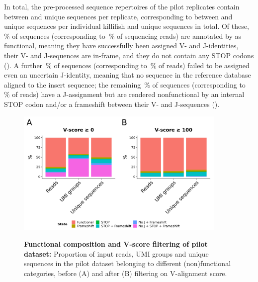 In total, the pre-processed sequence repertoires of the pilot replicates contain between  and  unique sequences per replicate, corresponding to between  and  unique sequences per individual killifish and  unique sequences in total. Of these, \,\% of sequences (corresponding to \,\% of sequencing reads) are annotated by  as functional, meaning they have successfully been assigned V- and J-identities, their V- and J-sequences are in-frame, and they do not contain any STOP codons (). A further \,\% of sequences (corresponding to \,\% of reads) failed to be assigned even an uncertain J-identity, meaning that no \jh sequence in the reference database aligned to the insert sequence; the remaining \,\% of sequences (corresponding to \,\% of reads) have a J-assignment but are rendered nonfunctional by an internal STOP codon and/or a frameshift between their V- and J-sequences ().

\begin{figure}
\centering
\includegraphics[width = 0.9\textwidth]{_Figures/png/pilot-functional-prop}
\begin{subfigure}{0em}
\label{fig:igseq-pilot-functional-prop-a}
\end{subfigure}
\begin{subfigure}{0em}
\label{fig:igseq-pilot-functional-prop-b}
\end{subfigure}
\caption[Functional composition and V-score filtering of \igseq pilot dataset]{\textbf{Functional composition and V-score filtering of \igseq pilot dataset:} Proportion of input reads, UMI groups and unique sequences in the pilot \igseq dataset belonging to different (non)functional categories, before (A) and after (B) filtering on V-alignment score.}
\label{fig:igseq-pilot-functional-prop}
\end{figure}

